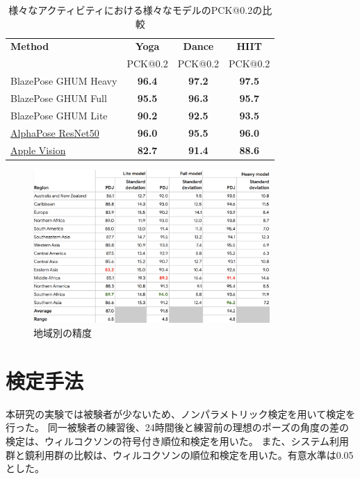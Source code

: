 \begin{table}[ht]
  \centering
  \begin{tabular}{|l|c|c|c|}
  \hline
  \textbf{Method} & \textbf{Yoga} & \textbf{Dance} & \textbf{HIIT} \\
                  & PCK@0.2       & PCK@0.2        & PCK@0.2       \\ 
  \hline
  BlazePose GHUM Heavy                                                      & \textbf{96.4} & \textbf{97.2} & \textbf{97.5} \\
  BlazePose GHUM Full                                                       & \textbf{95.5} & \textbf{96.3} & \textbf{95.7} \\
  BlazePose GHUM Lite                                                       & \textbf{90.2} & \textbf{92.5} & \textbf{93.5} \\
  \href{https://github.com/MVIG-SJTU/AlphaPose}{AlphaPose ResNet50}         & \textbf{96.0} & \textbf{95.5} & \textbf{96.0} \\
  \href{https://developer.apple.com/documentation/vision/detecting_human_body_poses_in_images}{Apple Vision} & \textbf{82.7} & \textbf{91.4} & \textbf{88.6} \\
  \hline
  \end{tabular}
  \caption{様々なアクティビティにおける様々なモデルのPCK@0.2の比較 \cite{pose-estimation-quality}}
  \label{tab:pose-estimation-quality}
\end{table}
  
\begin{figure}[H]
  \begin{center}
  \includegraphics[width=9cm]{figures/Model_Accuracy_by_Race.png}
  \caption{地域別の精度 \cite{Model-Accuracy-by-Race}}
  \label{fig:Model-Accuracy-by-Race}
  \end{center}
\end{figure}

\section{検定手法}
本研究の実験では被験者が少ないため、ノンパラメトリック検定を用いて検定を行った。
同一被験者の練習後、24時間後と練習前の理想のポーズの角度の差の検定は、ウィルコクソンの符号付き順位和検定を用いた。
また、システム利用群と鏡利用群の比較は、ウィルコクソンの順位和検定を用いた。有意水準は0.05とした。
